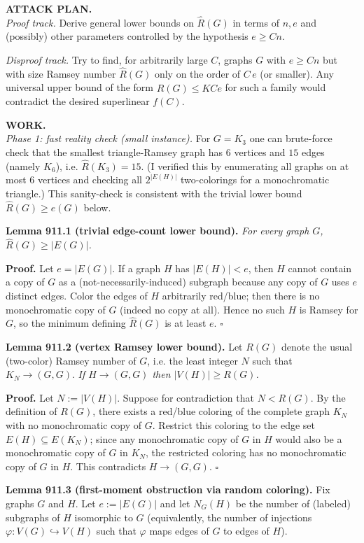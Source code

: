 \medskip
\noindent\textbf{ATTACK PLAN.}\\
\emph{Proof track.} Derive general lower bounds on $\hat R(G)$ in terms of $n,e$ and (possibly) other parameters controlled by the hypothesis $e\ge Cn$.

\smallskip
\noindent\emph{Disproof track.} Try to find, for arbitrarily large $C$, graphs $G$ with $e\ge Cn$ but with size Ramsey number $\hat R(G)$ only on the order of $C\,e$ (or smaller). Any universal upper bound of the form $\hat R(G)\le K C e$ for such a family would contradict the desired superlinear $f(C)$.

\medskip
\noindent\textbf{WORK.}\\
\emph{Phase 1: fast reality check (small instance).}  For $G=K_3$ one can brute-force check that the smallest triangle-Ramsey graph has $6$ vertices and $15$ edges (namely $K_6$), i.e. $\hat R(K_3)=15$. (I verified this by enumerating all graphs on at most $6$ vertices and checking all $2^{|E(H)|}$ two-colorings for a monochromatic triangle.) This sanity-check is consistent with the trivial lower bound $\hat R(G)\ge e(G)$ below.

\medskip
\noindent\textbf{Lemma 911.1 (trivial edge-count lower bound).} \emph{For every graph $G$, $\hat R(G)\ge |E(G)|$.}

\noindent\textbf{Proof.} Let $e=|E(G)|$. If a graph $H$ has $|E(H)|<e$, then $H$ cannot contain a copy of $G$ as a (not-necessarily-induced) subgraph because any copy of $G$ uses $e$ distinct edges. Color the edges of $H$ arbitrarily red/blue; then there is no monochromatic copy of $G$ (indeed no copy at all). Hence no such $H$ is Ramsey for $G$, so the minimum defining $\hat R(G)$ is at least $e$. \hfill$\square$

\medskip
\noindent\textbf{Lemma 911.2 (vertex Ramsey lower bound).}  Let $R(G)$ denote the usual (two-color) Ramsey number of $G$, i.e. the least integer $N$ such that $K_N\to (G,G)$. \emph{If $H\to (G,G)$ then $|V(H)|\ge R(G)$.}

\noindent\textbf{Proof.} Let $N:=|V(H)|$. Suppose for contradiction that $N<R(G)$. By the definition of $R(G)$, there exists a red/blue coloring of the complete graph $K_N$ with no monochromatic copy of $G$. Restrict this coloring to the edge set $E(H)\subseteq E(K_N)$; since any monochromatic copy of $G$ in $H$ would also be a monochromatic copy of $G$ in $K_N$, the restricted coloring has no monochromatic copy of $G$ in $H$. This contradicts $H\to (G,G)$. \hfill$\square$

\medskip
\noindent\textbf{Lemma 911.3 (first-moment obstruction via random coloring).}  Fix graphs $G$ and $H$. Let $e:=|E(G)|$ and let $N_G(H)$ be the number of (labeled) subgraphs of $H$ isomorphic to $G$ (equivalently, the number of injections $\varphi:V(G)\hookrightarrow V(H)$ such that $\varphi$ maps edges of $G$ to edges of $H$).

